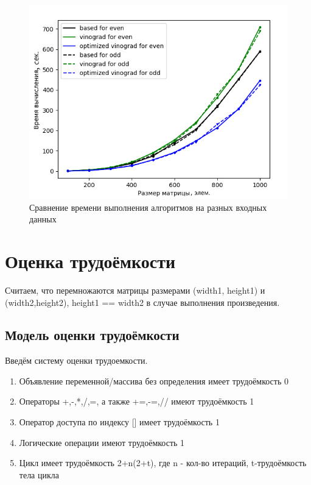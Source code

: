 \documentclass[a4paper,12pt]{report}
\begin{document}
        \begin{figure}[h!]
        	\centering
        	\includegraphics[width=0.8\linewidth]{graph_mult.jpg}
        	\caption{Сравнение времени выполнения алгоритмов на разных входных данных}
        	\label{ris:test1}
        \end{figure}
        
    \section{Оценка трудоёмкости}

        	Считаем, что перемножаются матрицы размерами (width1, height1) и (width2,height2), height1 == width2 в случае выполнения произведения.

    \subsection{Модель оценки трудоёмкости}

        	Введём систему оценки трудоемкости.
        	\begin{enumerate} 
	        	\item Объявление переменной/массива без определения имеет трудоёмкость 0\\
	        	\item Операторы +,-,*,/,=, а также +=,-=,// имеют трудоёмкость 1\\
	        	\item Оператор доступа по индексу [] имеет трудоёмкость 1\\
	        	\item Логические операции имеют трудоёмкость 1\\
	        	\item Цикл имеет трудоёмкость 2+n(2+t), где n - кол-во итераций, t-трудоёмкость тела цикла	
        	\end{enumerate}
	
\end{document}
